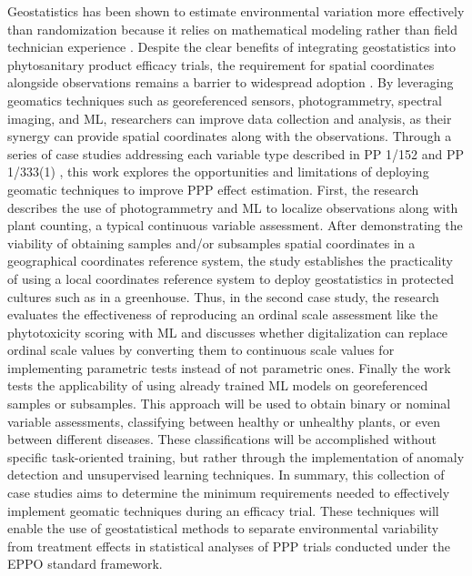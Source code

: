\documentclass[12pt,a4paper,oneside]{report}
\begin{document}
Geostatistics has been shown to estimate environmental variation more effectively 
than randomization because it relies on mathematical modeling rather than field 
technician experience \cite{aquiles_e_effect_2024}.
Despite the clear benefits of integrating geostatistics into phytosanitary
product efficacy trials, the requirement for spatial coordinates alongside 
observations remains a barrier to widespread adoption
\cite{oliverGeostatisticalApplicationsPrecision2010,websterGeostatisticsEnvironmentalScientists2007}.
By leveraging geomatics techniques such as georeferenced sensors, photogrammetry,
spectral imaging, and ML, researchers can improve data collection and 
analysis, as their synergy can provide spatial coordinates
along with the observations.
Through a series of case studies addressing each variable type described in 
PP 1/152 \cite{EPPO_PP1_152} and 
PP 1/333(1) \cite{PP1333}, 
this work explores the opportunities and limitations of deploying geomatic techniques 
to improve PPP effect estimation.
First, the research describes the use of photogrammetry and ML to localize observations
along with plant counting, a typical continuous variable assessment. 
After demonstrating the viability of obtaining samples and/or subsamples spatial coordinates in a
geographical coordinates reference system, the study establishes the practicality of using a local 
coordinates reference system to deploy geostatistics in protected cultures such as in 
a greenhouse. Thus, in the second case study, the research evaluates the effectiveness of 
reproducing an ordinal scale assessment like the phytotoxicity scoring with 
ML and discusses whether digitalization can replace ordinal scale values by 
converting them to continuous scale values for implementing parametric tests instead 
of not parametric
ones. Finally the work tests the applicability of using already trained ML models 
on georeferenced samples or subsamples. This approach will be used to
obtain binary or nominal variable assessments, classifying between healthy or unhealthy
plants, or even between different diseases. These classifications will be accomplished 
without specific task-oriented training, but rather through the implementation of 
anomaly detection and unsupervised learning techniques.
In summary, this collection of case studies aims to determine the minimum requirements 
needed to effectively implement geomatic techniques during an efficacy trial. 
These techniques will enable 
the use of geostatistical methods to separate environmental variability from treatment 
effects in statistical analyses of PPP trials conducted under 
the EPPO standard framework.
\end{document}
